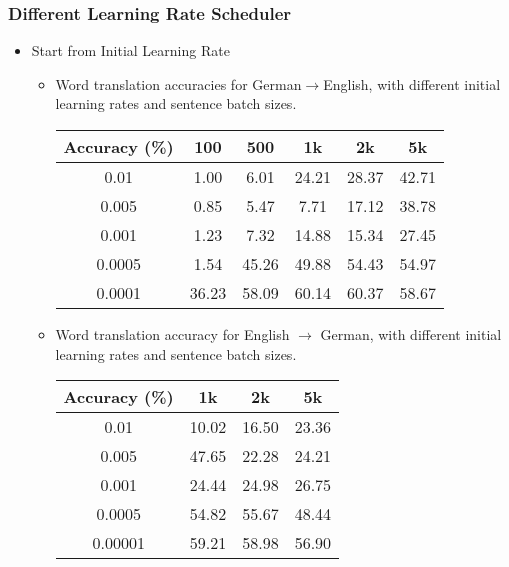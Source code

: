 \subsubsection{Different Learning Rate Scheduler}
\begin{itemize}
	\item Start from Initial Learning Rate
	\begin{itemize}
		\item Word translation accuracies for German$\rightarrow$English,  with different initial learning rates and sentence batch sizes.
		\begin{table}[H]
			\centering
			\begin{tabular}{cccccc}
				\hline
				Accuracy (\%) & 100   & 500   & 1k    & 2k    & 5k    \\ \hline
				0.01          & 1.00  & 6.01  & 24.21 & 28.37 & 42.71 \\ \hline
				0.005         & 0.85  & 5.47  & 7.71  & 17.12 & 38.78 \\ \hline
				0.001         & 1.23  & 7.32  & 14.88 & 15.34 & 27.45 \\ \hline
				0.0005        & 1.54  & 45.26 & 49.88 & 54.43 & 54.97 \\ \hline
				0.0001        & 36.23 & 58.09 & 60.14 & 60.37 & 58.67 \\ \hline
			\end{tabular}
		\end{table}
		\item Word translation accuracy for English $\rightarrow$ German, with different initial learning rates and sentence batch sizes.
		\begin{table}[H]
			\centering
			\begin{tabular}{cccc}
				\hline
				Accuracy (\%) & 1k   & 2k   & 5k      \\ \hline
				0.01          & 10.02  & 16.50  & 23.36 \\ \hline
				0.005       & 47.65 & 22.28 & 24.21 \\ \hline
				0.001        & 24.44 & 24.98 & 26.75 \\ \hline
				0.0005          & 54.82  & 55.67  & 48.44 \\ \hline
				0.00001        & 59.21 & 58.98 & 56.90 \\ \hline
			\end{tabular}
		\end{table}	


\end{itemize}
\end{itemize}
